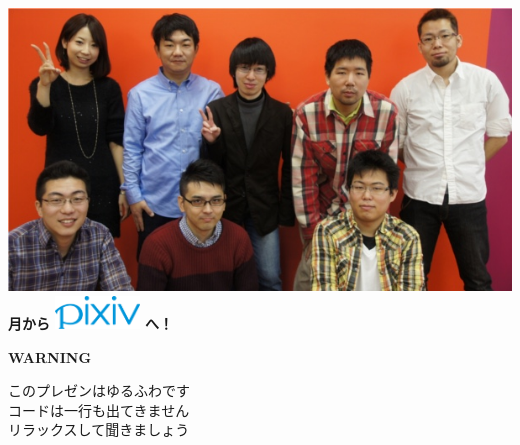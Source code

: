 \documentclass[dvipdfm,cjk,14pt,hyperref={bookmarks=false,compress,slidestop}]{beamer}
\begin{document}
\begin{frame}[plain]
 \begin{center}
  \LARGE
  \includegraphics[clip, height=58truemm]{pixivall}\\
  \bfseries{} 月から \includegraphics[clip,
  height=25pt]{pixiv_logo} \hspace{2pt}  へ！
 \end{center}
\end{frame}

\begin{frame}[plain]
 \begin{center}
  \Huge
  \textbf{WARNING}
 \end{center}
\end{frame}

\begin{frame}[plain]
 \begin{center}
  \LARGE
  このプレゼンはゆるふわです\\
  コードは一行も出てきません\\
  リラックスして聞きましょう
 \end{center}
\end{frame}
\end{document}
